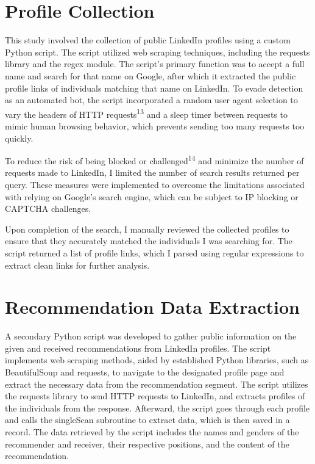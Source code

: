 \documentclass[12pt]{caltech_thesis}
\begin{document}
\section{Profile Collection}
This study involved the collection of public LinkedIn profiles using a custom Python script. The script utilized web scraping techniques, including the requests library and the regex module. The script's primary function was to accept a full name and search for that name on Google, after which it extracted the public profile links of individuals matching that name on LinkedIn. To evade detection as an automated bot, the script incorporated a random user agent selection to vary the headers of HTTP requests\textsuperscript{13} and a sleep timer between requests to mimic human browsing behavior, which prevents sending too many requests too quickly.

To reduce the risk of being blocked or challenged\textsuperscript{14} and minimize the number of requests made to LinkedIn, I limited the number of search results returned per query. These measures were implemented to overcome the limitations associated with relying on Google's search engine, which can be subject to IP blocking or CAPTCHA challenges.

Upon completion of the search, I manually reviewed the collected profiles to ensure that they accurately matched the individuals I was searching for. The script returned a list of profile links, which I parsed using regular expressions to extract clean links for further analysis.

\section{Recommendation Data Extraction}
A secondary Python script was developed to gather public information on the given and received recommendations from LinkedIn profiles. The script implements web scraping methods, aided by established Python libraries, such as BeautifulSoup and requests, to navigate to the designated profile page and extract the necessary data from the recommendation segment. The script utilizes the requests library to send HTTP requests to LinkedIn, and extracts profiles of the individuals from the response. Afterward, the script goes through each profile and calls the singleScan subroutine to extract data, which is then saved in a record. The data retrieved by the script includes the names and genders of the recommender and receiver, their respective positions, and the content of the recommendation.
\end{document}
